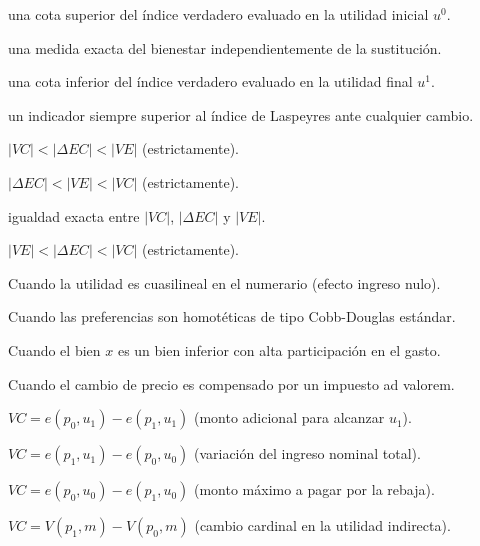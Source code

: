 \begin{opts}
    \item una cota superior del índice verdadero evaluado en la utilidad inicial $u^0$.
    \item una medida exacta del bienestar independientemente de la sustitución.
    \item una cota inferior del índice verdadero evaluado en la utilidad final $u^1$.
    \item un indicador siempre superior al índice de Laspeyres ante cualquier cambio.
\end{opts}

\begin{opts}
    \item $|VC| < |\Delta EC| < |VE|$ (estrictamente).
    \item $|\Delta EC| < |VE| < |VC|$ (estrictamente).
    \item igualdad exacta entre $|VC|$, $|\Delta EC|$ y $|VE|$.
    \item $|VE| < |\Delta EC| < |VC|$ (estrictamente).
\end{opts}

\begin{opts}
    \item Cuando la utilidad es cuasilineal en el numerario (efecto ingreso nulo).
    \item Cuando las preferencias son homotéticas de tipo Cobb-Douglas estándar.
    \item Cuando el bien $x$ es un bien inferior con alta participación en el gasto.
    \item Cuando el cambio de precio es compensado por un impuesto ad valorem.
\end{opts}

\begin{opts}
    \item $VC = e(p_0, u_1) - e(p_1, u_1)$ (monto adicional para alcanzar $u_1$).
    \item $VC = e(p_1, u_1) - e(p_0, u_0)$ (variación del ingreso nominal total).
    \item $VC = e(p_0, u_0) - e(p_1, u_0)$ (monto máximo a pagar por la rebaja).
    \item $VC = V(p_1, m) - V(p_0, m)$ (cambio cardinal en la utilidad indirecta).
\end{opts}

